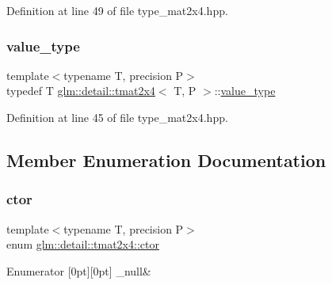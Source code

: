 Definition at line 49 of file type\+\_\+mat2x4.\+hpp.

\mbox{\label{structglm_1_1detail_1_1tmat2x4_a4c650fe9e8b18e4b41fc8f6b3c5e0fb7}} 
\subsubsection{\texorpdfstring{value\+\_\+type}{value\_type}}
{\footnotesize\ttfamily template$<$typename T, precision P$>$ \\
typedef T \hyperlink{structglm_1_1detail_1_1tmat2x4}{glm\+::detail\+::tmat2x4}$<$ T, P $>$\+::\hyperlink{structglm_1_1detail_1_1tmat2x4_a4c650fe9e8b18e4b41fc8f6b3c5e0fb7}{value\+\_\+type}}



Definition at line 45 of file type\+\_\+mat2x4.\+hpp.



\subsection{Member Enumeration Documentation}
\mbox{\label{structglm_1_1detail_1_1tmat2x4_a3876cfcf80892580917b2b0417c22c24}} 
\subsubsection{\texorpdfstring{ctor}{ctor}}
{\footnotesize\ttfamily template$<$typename T, precision P$>$ \\
enum \hyperlink{structglm_1_1detail_1_1tmat2x4_a3876cfcf80892580917b2b0417c22c24}{glm\+::detail\+::tmat2x4\+::ctor}}

\begin{DoxyEnumFields}{Enumerator}
[0pt][0pt]{}\mbox{\label{structglm_1_1detail_1_1tmat2x4_a3876cfcf80892580917b2b0417c22c24a1f9441d2e671b6cbcb17f580afb1b2b0}} 
\+\_\+null&\\
\hline

\end{DoxyEnumFields}


